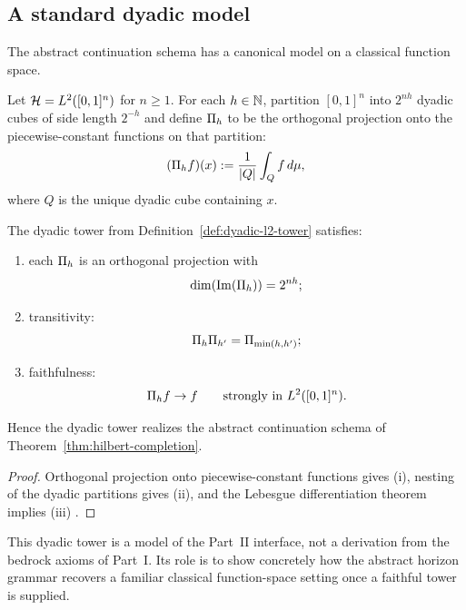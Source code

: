 \subsection{A standard dyadic model}

The abstract continuation schema has a canonical model on a classical function
space.

\begin{definition}
\label{def:dyadic-l2-tower}
Let $\mathcal{H}=L^2([0,1]^n)$ for $n\ge 1$. For each $h\in\mathbb{N}$, partition $[0,1]^n$
into $2^{nh}$ dyadic cubes of side length $2^{-h}$ and define $\Pi_{h}$ to be
the orthogonal projection onto the piecewise-constant functions on that
partition:
\[
(\Pi_{h}f)(x)
:=
\frac{1}{|Q|}\int_Q f\,d\mu,
\]
where $Q$ is the unique dyadic cube containing $x$.
\end{definition}

\begin{proposition}
\label{prop:dyadic-tower-properties}
The dyadic tower from Definition~\ref{def:dyadic-l2-tower} satisfies:
\begin{enumerate}[label=(\roman*), leftmargin=2em, itemsep=0.2em]
\item each $\Pi_{h}$ is an orthogonal projection with
      \[
      \dim(\mathrm{Im}(\Pi_{h}))=2^{nh};
      \]
\item transitivity:
      \[
      \Pi_{h}\Pi_{h'}=\Pi_{\min(h,h')};
      \]
\item faithfulness:
      \[
      \Pi_{h}f\to f
      \qquad\text{strongly in }L^2([0,1]^n).
      \]
\end{enumerate}
Hence the dyadic tower realizes the abstract continuation schema of
Theorem~\ref{thm:hilbert-completion}.
\end{proposition}

\begin{proof}
Orthogonal projection onto piecewise-constant functions gives (i), nesting of
the dyadic partitions gives (ii), and the Lebesgue differentiation theorem
implies (iii) \cite{Folland1999}.
\end{proof}

\begin{remark}
\label{rem:dyadic-model-status}
This dyadic tower is a model of the Part~II interface, not a derivation from the
bedrock axioms of Part~I. Its role is to show concretely how the abstract
horizon grammar recovers a familiar classical function-space setting once a
faithful tower is supplied.
\end{remark}
